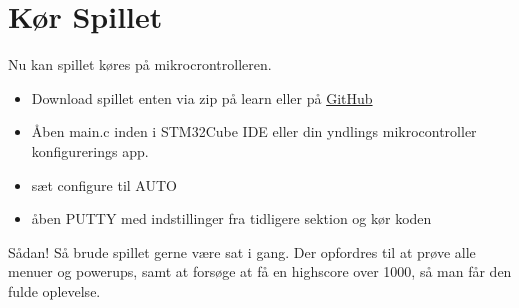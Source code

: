 \section{Kør Spillet} 
\label{chap:Brugermanual_sec:software}
\vspace{0.5em}

Nu kan spillet køres på mikrocrontrolleren. 
\begin{itemize}
    \setlength{\itemsep}{4pt}
    \setlength{\parskip}{0pt}
    \setlength{\parsep}{0pt}
    \item Download spillet enten via zip på learn eller på \href{https://github.com/wrl6765/DTU-30010-Gruppe-13}{GitHub}
    \item Åben main.c inden i STM32Cube IDE eller din yndlings mikrocontroller konfigurerings app.
    \item sæt configure til AUTO
    \item åben PUTTY med indstillinger fra tidligere sektion og kør koden
\end{itemize}

Sådan! Så brude spillet gerne være sat i gang. Der opfordres til at prøve alle menuer og powerups, samt at forsøge at få en highscore over 1000, så man får den fulde oplevelse.
